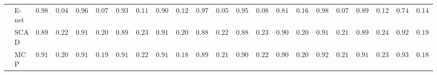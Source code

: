 \begin{tabular}{p{0.2cm}p{1cm}|p{0.6cm}p{0.6cm}|p{0.6cm}p{0.6cm}p{0.6cm}p{0.6cm}p{0.6cm}p{0.6cm}|p{0.6cm}p{0.6cm}p{0.6cm}p{0.6cm}p{0.6cm}p{0.6cm}|p{0.6cm}p{0.6cm}p{0.6cm}p{0.6cm}p{0.6cm}p{0.6cm}}
 & E-net  & $0.9850$ & $0.0479$ & $0.9650$ & $0.0796$ & $0.9367$ & $0.1155$ & $0.9050$ & $0.1237$ & $0.9750$ & $0.0598$ & $0.9550$ & $0.0849$ & $0.8167$ & $0.1633$ & $0.9800$ & $0.0760$ & $0.8933$ & $0.1287$ & $0.7467$ & $0.1411$ \\
 & SCAD  & $0.8900$ & $0.2275$ & $0.9100$ & $0.2057$ & $0.8933$ & $0.2375$ & $0.9100$ & $0.2030$ & $0.8833$ & $0.2278$ & $0.8833$ & $0.2363$ & $0.9067$ & $0.2083$ & $0.9150$ & $0.2165$ & $0.8950$ & $0.2458$ & $0.9267$ & $0.1915$ \\
 & MCP  & $0.9117$ & $0.2002$ & $0.9183$ & $0.1961$ & $0.9133$ & $0.2241$ & $0.9100$ & $0.1872$ & $0.8983$ & $0.2183$ & $0.9033$ & $0.2250$ & $0.9083$ & $0.2043$ & $0.9250$ & $0.2111$ & $0.9117$ & $0.2302$ & $0.9317$ & $0.1867$ \\
\hline 
\end{tabular}

